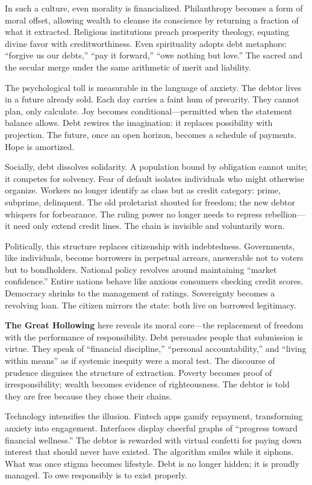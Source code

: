 \documentclass[11pt,twoside]{book}
\begin{document}
In such a culture, even morality is financialized.  Philanthropy becomes a form of moral offset, allowing wealth to cleanse its conscience by returning a fraction of what it extracted.  Religious institutions preach prosperity theology, equating divine favor with creditworthiness.  Even spirituality adopts debt metaphors: “forgive us our debts,” “pay it forward,” “owe nothing but love.”  The sacred and the secular merge under the same arithmetic of merit and liability.

The psychological toll is measurable in the language of anxiety.  The debtor lives in a future already sold.  Each day carries a faint hum of precarity.  They cannot plan, only calculate.  Joy becomes conditional—permitted when the statement balance allows.  Debt rewires the imagination: it replaces possibility with projection.  The future, once an open horizon, becomes a schedule of payments.  Hope is amortized.

Socially, debt dissolves solidarity.  A population bound by obligation cannot unite; it competes for solvency.  Fear of default isolates individuals who might otherwise organize.  Workers no longer identify as class but as credit category: prime, subprime, delinquent.  The old proletariat shouted for freedom; the new debtor whispers for forbearance.  The ruling power no longer needs to repress rebellion—it need only extend credit lines.  The chain is invisible and voluntarily worn.

Politically, this structure replaces citizenship with indebtedness.  Governments, like individuals, become borrowers in perpetual arrears, answerable not to voters but to bondholders.  National policy revolves around maintaining “market confidence.”  Entire nations behave like anxious consumers checking credit scores.  Democracy shrinks to the management of ratings.  Sovereignty becomes a revolving loan.  The citizen mirrors the state: both live on borrowed legitimacy.

\textbf{The Great Hollowing} here reveals its moral core—the replacement of freedom with the performance of responsibility.  Debt persuades people that submission is virtue.  They speak of “financial discipline,” “personal accountability,” and “living within means” as if systemic inequity were a moral test.  The discourse of prudence disguises the structure of extraction.  Poverty becomes proof of irresponsibility; wealth becomes evidence of righteousness.  The debtor is told they are free because they chose their chains.

Technology intensifies the illusion.  Fintech apps gamify repayment, transforming anxiety into engagement.  Interfaces display cheerful graphs of “progress toward financial wellness.”  The debtor is rewarded with virtual confetti for paying down interest that should never have existed.  The algorithm smiles while it siphons.  What was once stigma becomes lifestyle.  Debt is no longer hidden; it is proudly managed.  To owe responsibly is to exist properly.
\end{document}
